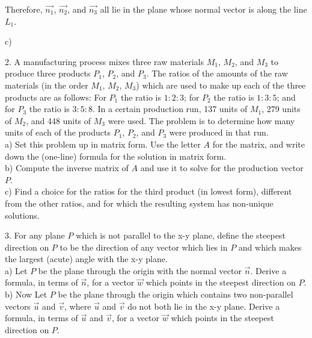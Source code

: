 \documentclass{article}
\begin{document}
Therefore, $\vec{n_1}$, $\vec{n_2}$, and $\vec{n_3}$ all lie in the plane whose 
normal vector is along the line $L_1$.

c)


2. A manufacturing process mixes three raw materials $M_1$, $M_2$, and $M_3$ to 
produce three products $P_1$, $P_2$, and $P_3$. The ratios of the amounts of the 
raw materials (in the order $M_1$, $M_2$, $M_3$) which are used to make up each 
of the three products are as follows: For $P_1$ the ratio is $1:2:3$; for $P_2$ 
the ratio is $1:3:5$; and for $P_3$ the ratio is $3:5:8$. In a certain 
production run, 137 units of $M_1$, 279 units of $M_2$, and 448 units of $M_3$ 
were used. The problem is to determine how many units of each of the products 
$P_1$, $P_2$, and $P_3$ were produced in that run. \\
a) Set this problem up in matrix form. Use the letter $A$ for the matrix, and 
write down the (one-line) formula for the solution in matrix form. \\
b) Compute the inverse matrix of $A$ and use it to solve for the production 
vector $P$. \\
c) Find a choice for the ratios for the third product (in lowest form), 
different from the other ratios, and for which the resulting system has 
non-unique solutions.

3. For any plane $P$ which is not parallel to the x-y plane, define the steepest 
direction on $P$ to be the direction of any vector which lies in $P$ and which 
makes the largest (acute) angle with the x-y plane. \\
a) Let $P$ be the plane through the origin with the normal vector $\vec{n}$. 
Derive a formula, in terms of $\vec{n}$, for a vector $\vec{w}$ which points in 
the steepest direction on $P$. \\
b) Now Let $P$ be the plane through the origin which contains two non-parallel 
vectors $\vec{u}$ and $\vec{v}$, where $\vec{u}$ and $\vec{v}$ do not both lie 
in the x-y plane. Derive a formula, in terms of $\vec{u}$ and $\vec{v}$, for a 
vector $\vec{w}$ which points in the steepest direction on $P$.
\end{document}
